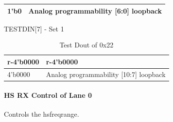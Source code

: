 \documentclass[main\_\_EN.tex]{subfiles}
\begin{document}
\begin{itemize}
\begin{longtable}{ |p{3cm}|p{9cm}|}
            1'b0 & Analog programmability [6:0] loopback \\ \hline
        \end{longtable}
        TESTDIN[7] - Set 1
        \begin{longtable}{ |p{3cm}|p{9cm}|}
            \caption{Test Dout of 0x22}
            \label{tab:test-dout-0x22-set1} \\
            \hline
            \rowcolor{lightgray}
            \textbf{r-4'b0000} & \textbf{r-4'b0000} \\ \hline
            4'b0000 & Analog programmability [10:7] loopback \\ \hline
        \end{longtable}
\end{itemize}


\paragraph{HS RX Control of Lane 0}
\label{sec:test-code-0x44}
Controls the hsfreqrange.
\end{document}
